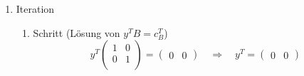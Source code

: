 \documentclass[a4paper]{scrartcl}
\begin{document}
\begin{enumerate}[label=\bfseries\arabic*.]
        \begin{enumerate}[1.]
            \item Iteration
                \begin{enumerate}[1.]
                    \item Schritt (Lösung von $y^TB = c_B^T$)
                        \begin{equation}
                            y^T
                            \begin{pmatrix}
                                1 & 0 \\
                                0 & 1 \\
                            \end{pmatrix}
                            =
                            \begin{pmatrix}
                                0 & 0
                            \end{pmatrix}
                            \quad\Rightarrow\quad
                            y^T =
                            \begin{pmatrix}
                                0 & 0
                            \end{pmatrix}
                        \end{equation}
                        

\end{enumerate}
\end{enumerate}
\end{enumerate}
\end{document}
